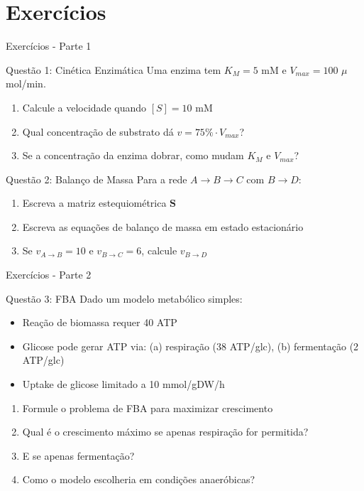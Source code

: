\section{Exercícios}

\begin{frame}{Exercícios - Parte 1}
\begin{block}{Questão 1: Cinética Enzimática}
Uma enzima tem $K_M = 5$ mM e $V_{max} = 100$ $\mu$mol/min.
\begin{enumerate}
    \item Calcule a velocidade quando $[S] = 10$ mM
    \item Qual concentração de substrato dá $v = 75\% \cdot V_{max}$?
    \item Se a concentração da enzima dobrar, como mudam $K_M$ e $V_{max}$?
\end{enumerate}
\end{block}

\begin{block}{Questão 2: Balanço de Massa}
Para a rede $A \rightarrow B \rightarrow C$ com $B \rightarrow D$:
\begin{enumerate}
    \item Escreva a matriz estequiométrica $\mathbf{S}$
    \item Escreva as equações de balanço de massa em estado estacionário
    \item Se $v_{A \rightarrow B} = 10$ e $v_{B \rightarrow C} = 6$, calcule $v_{B \rightarrow D}$
\end{enumerate}
\end{block}
\end{frame}

\begin{frame}{Exercícios - Parte 2}
\begin{block}{Questão 3: FBA}
Dado um modelo metabólico simples:
\begin{itemize}
    \item Reação de biomassa requer 40 ATP
    \item Glicose pode gerar ATP via: (a) respiração (38 ATP/glc), (b) fermentação (2 ATP/glc)
    \item Uptake de glicose limitado a 10 mmol/gDW/h
\end{itemize}

\begin{enumerate}
    \item Formule o problema de FBA para maximizar crescimento
    \item Qual é o crescimento máximo se apenas respiração for permitida?
    \item E se apenas fermentação?
    \item Como o modelo escolheria em condições anaeróbicas?
\end{enumerate}
\end{block}
\end{frame}

